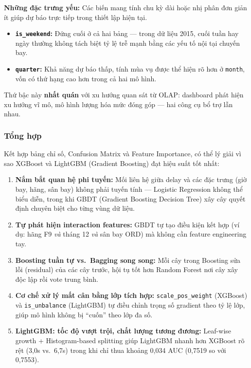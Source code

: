 \textbf{Những đặc trưng yếu:} Các biến mang tính chu kỳ dài hoặc nhị phân đơn giản ít giúp dự báo trực tiếp trong thiết lập hiện tại.
\begin{itemize}
    \item \textbf{\texttt{is\_weekend}:}
          Đứng cuối ở cả hai bảng --- trong dữ liệu 2015, cuối tuần hay ngày thường
          không tách biệt tỷ lệ trễ mạnh bằng các yếu tố nội tại chuyến bay.
    \item \textbf{\texttt{quarter}:}
          Khả năng dự báo thấp, tính mùa vụ được thể hiện rõ hơn ở \texttt{month},
          vốn có thứ hạng cao hơn trong cả hai mô hình.
\end{itemize}

Thứ bậc này \textbf{nhất quán} với xu hướng quan sát từ OLAP:
dashboard phát hiện xu hướng vĩ mô, mô hình lượng hóa mức đóng góp
--- hai công cụ bổ trợ lẫn nhau.

\subsubsection{Tổng hợp}

Kết hợp bảng chỉ số, Confusion Matrix và Feature Importance,
có thể lý giải vì sao XGBoost và LightGBM (Gradient Boosting) đạt hiệu suất tốt nhất:

\begin{enumerate}
    \item \textbf{Nắm bắt quan hệ phi tuyến:}
          Mối liên hệ giữa delay và các đặc trưng (giờ bay, hãng, sân bay)
          không phải tuyến tính --- Logistic Regression không thể biểu diễn,
          trong khi GBDT (Gradient Boosting Decision Tree) xây cây quyết định chuyên biệt cho từng vùng dữ liệu.

    \item \textbf{Tự phát hiện interaction features:}
          GBDT tự tạo điều kiện kết hợp (ví dụ: hãng F9 \textit{và} tháng 12
          \textit{và} sân bay ORD) mà không cần feature engineering tay.

    \item \textbf{Boosting tuần tự vs.\ Bagging song song:}
          Mỗi cây trong Boosting sửa lỗi (residual) của các cây trước,
          hội tụ tốt hơn Random Forest nơi cây xây độc lập rồi vote trung bình.

    \item \textbf{Cơ chế xử lý mất cân bằng lớp tích hợp:}
          \texttt{scale\_pos\_weight} (XGBoost) và \texttt{is\_unbalance} (LightGBM)
          tự điều chỉnh trọng số gradient theo tỷ lệ lớp,
          giúp mô hình không bị ``cuốn'' theo lớp đa số.

    \item \textbf{LightGBM: tốc độ vượt trội, chất lượng tương đương:}
          Leaf-wise growth + Histogram-based splitting
          giúp LightGBM nhanh hơn XGBoost rõ rệt (3,0s vs.\ 6,7s)
          trong khi chỉ thua khoảng 0,034 AUC (0,7519 so với 0,7553).
\end{enumerate}

